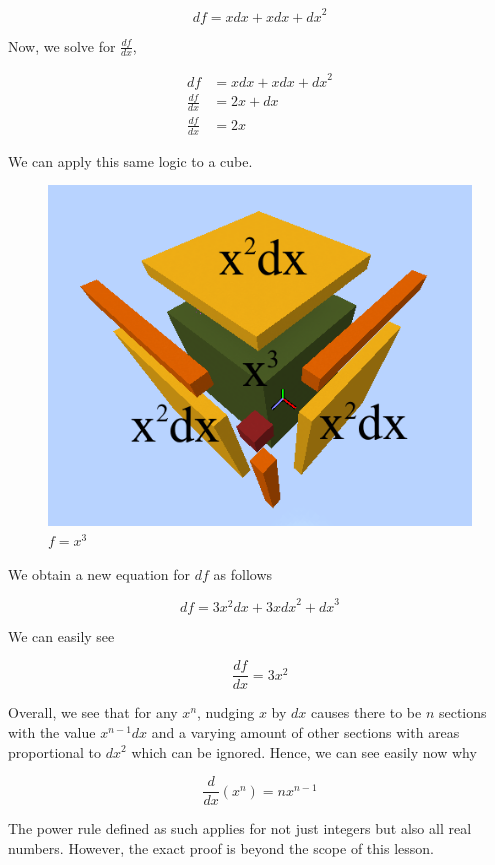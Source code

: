 \documentclass[a4paper,12pt,oneside]{book}
\begin{document}
$$df=xdx+xdx+{dx}^2$$

 \noindent Now, we solve for $\frac{df}{dx}$,
 
$$
\begin{aligned}
df&=xdx+xdx+{dx}^2\\
\frac{df}{dx}&=2x+dx\\
\frac{df}{dx}&=2x
\end{aligned}$$

\noindent We can apply this same logic to a cube.

\begin{figure}[H]
    \begin{center}
        \includegraphics[scale=0.75]{img/zayan/pr2.png}
        \caption{$f=x^3$}
        \label{fig:pr2}
    \end{center}
\end{figure}

\noindent We obtain a new equation for $df$ as follows

$$df = 3x^2dx+3x{dx}^2+{dx}^3$$

\noindent We can easily see

$$\frac{df}{dx}=3x^2$$

\noindent Overall, we see that for any $x^n$, nudging $x$ by $dx$ causes there to be $n$ sections with the value $x^{n-1}dx$ and a varying amount of other sections with areas proportional to $dx^2$ which can be ignored. Hence, we can see easily now why

$$\frac{d}{dx}(x^n)=nx^{n-1}$$

\noindent The power rule defined as such applies for not just integers but also all real numbers. However, the exact proof is beyond the scope of this lesson.
\end{document}
